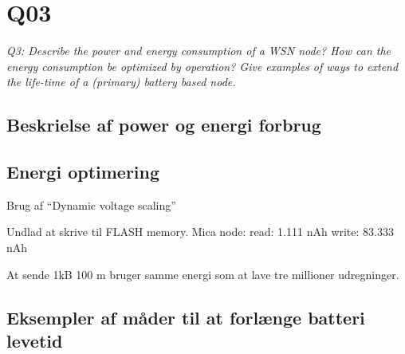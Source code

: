 \chapter{Q03}
\emph{Q3: Describe the power and energy consumption of a WSN node? How can the
energy consumption be optimized by operation? Give examples of ways to extend
the life-time of a (primary) battery based node.}

\section{Beskrielse af power og energi forbrug}

\section{Energi optimering}
Brug af ``Dynamic voltage scaling''

Undlad at skrive til FLASH memory.
Mica node:
read: 1.111 nAh
write: 83.333 nAh

At sende 1kB 100 m bruger samme energi som at lave tre millioner udregninger.

\section{Eksempler af måder til at forlænge batteri levetid}
